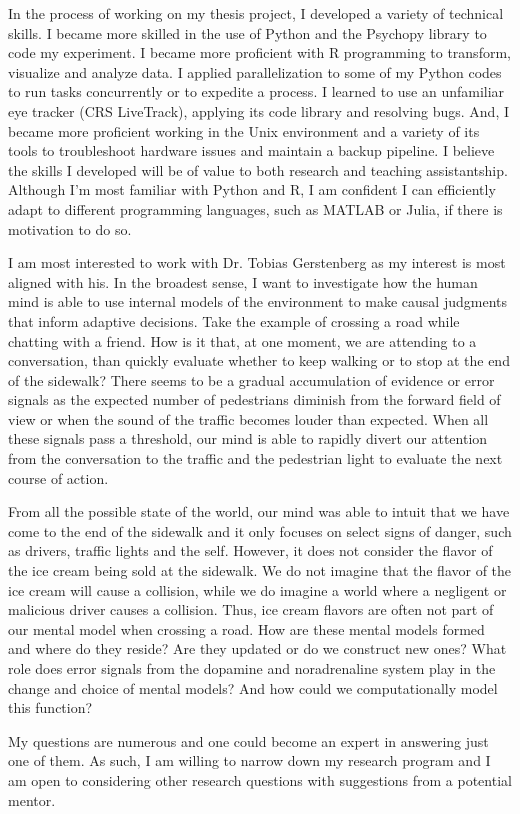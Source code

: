 \documentclass[12pt]{article}
\begin{document}
	In the process of working on my thesis project, I developed a variety of technical skills. I became more skilled in the use of Python and the Psychopy library to code my experiment. I became more proficient with R programming to transform, visualize and analyze data. I applied parallelization to some of my Python codes to run tasks concurrently or to expedite a process. I learned to use an unfamiliar eye tracker (CRS LiveTrack), applying its code library and resolving bugs. And, I became more proficient working in the Unix environment and a variety of its tools to troubleshoot hardware issues and maintain a backup pipeline. I believe the skills I developed will be of value to both research and teaching assistantship. Although I’m most familiar with Python and R, I am confident I can efficiently adapt to different programming languages, such as MATLAB or Julia, if there is motivation to do so.
	
	I am most interested to work with Dr. Tobias Gerstenberg as my interest is most aligned with his. In the broadest sense, I want to investigate how the human mind is able to use internal models of the environment to make causal judgments that inform adaptive decisions. Take the example of crossing a road while chatting with a friend. How is it that, at one moment, we are attending to a conversation, than quickly evaluate whether to keep walking or to stop at the end of the sidewalk? There seems to be a gradual accumulation of evidence or error signals as the expected number of pedestrians diminish from the forward field of view or when the sound of the traffic becomes louder than expected. When all these signals pass a threshold, our mind is able to rapidly divert our attention from the conversation to the traffic and the pedestrian light to evaluate the next course of action.
	
	From all the possible state of the world, our mind was able to intuit that we have come to the end of the sidewalk and it only focuses on select signs of danger, such as drivers, traffic lights and the self. However, it does not consider the flavor of the ice cream being sold at the sidewalk. We do not imagine that the flavor of the ice cream will cause a collision, while we do imagine a world where a negligent or malicious driver causes a collision. Thus, ice cream flavors are often not part of our mental model when crossing a road. How are these mental models formed and where do they reside? Are they updated or do we construct new ones? What role does error signals from the dopamine and noradrenaline system play in the change and choice of mental models? And how could we computationally model this function?

	My questions are numerous and one could become an expert in answering just one of them. As such, I am willing to narrow down my research program and I am open to considering other research questions with suggestions from a potential mentor.
	
\end{document}

